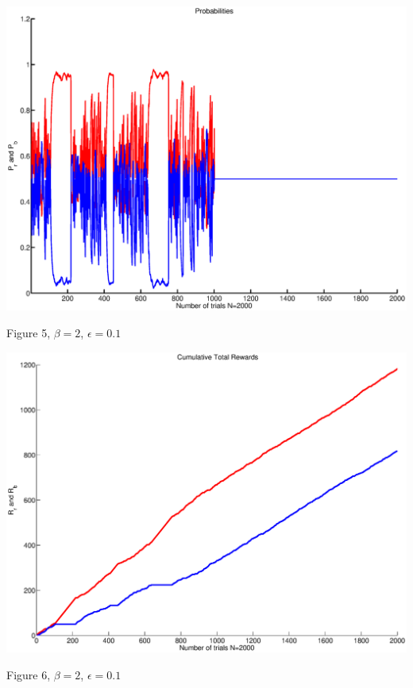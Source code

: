 \documentclass{article}
\begin{document}
\begin{center}
\includegraphics[width=\textwidth]{prob2.eps}
\begin{footnotesize}
 Figure 5, $\beta=2$, $\epsilon=0.1$
\end{footnotesize}
\end{center}

\begin{center}
\includegraphics[width=\textwidth]{rew2.eps}
\begin{footnotesize}
 Figure 6, $\beta=2$, $\epsilon=0.1$
\end{footnotesize}
\end{center}
\end{document}
